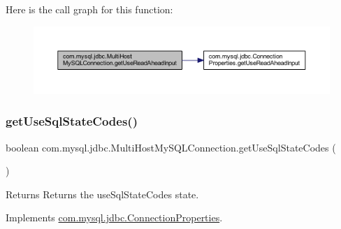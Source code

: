Here is the call graph for this function\+:
\nopagebreak
\begin{figure}[H]
\begin{center}
\leavevmode
\includegraphics[width=350pt]{classcom_1_1mysql_1_1jdbc_1_1_multi_host_my_s_q_l_connection_a06e5584ec8ed2f0025af2929d47cfe34_cgraph}
\end{center}
\end{figure}
\mbox{\label{classcom_1_1mysql_1_1jdbc_1_1_multi_host_my_s_q_l_connection_a37a3f2b05b0f82fbc27d8a197bb6cd70}} 
\subsubsection{\texorpdfstring{get\+Use\+Sql\+State\+Codes()}{getUseSqlStateCodes()}}
{\footnotesize\ttfamily boolean com.\+mysql.\+jdbc.\+Multi\+Host\+My\+S\+Q\+L\+Connection.\+get\+Use\+Sql\+State\+Codes (\begin{DoxyParamCaption}{ }\end{DoxyParamCaption})}

\begin{DoxyReturn}{Returns}
Returns the use\+Sql\+State\+Codes state. 
\end{DoxyReturn}


Implements \mbox{\hyperlink{interfacecom_1_1mysql_1_1jdbc_1_1_connection_properties_a399c463bcd4def7a8476647b2e09fd72}{com.\+mysql.\+jdbc.\+Connection\+Properties}}.

